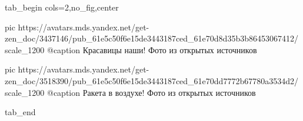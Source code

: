  
 
 
 
 


\ifcmt
  tab_begin cols=2,no_fig,center

     pic https://avatars.mds.yandex.net/get-zen_doc/3437146/pub_61e5c50f6e15de3443187ced_61e70d8d35b3b86453067412/scale_1200
		 @caption Красавицы наши! Фото из открытых источников

		 pic https://avatars.mds.yandex.net/get-zen_doc/3518390/pub_61e5c50f6e15de3443187ced_61e70dd7772b67780a3534d2/scale_1200
		 @caption Ракета в воздухе! Фото из открытых источников

  tab_end
\fi
